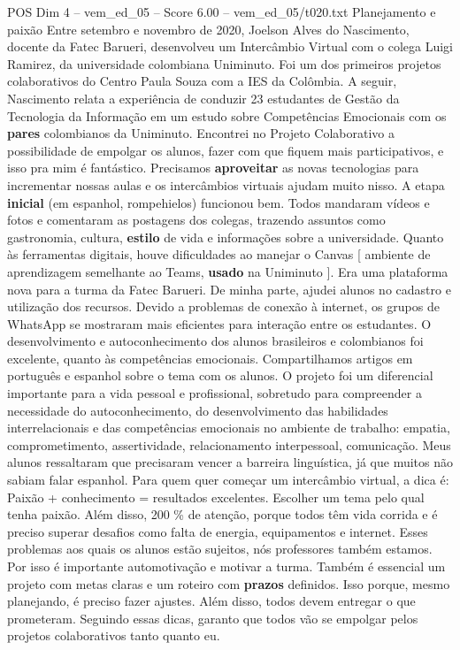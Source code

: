 \begin{textsample}{POS Dim 4 – vem\_ed\_05 – Score 6.00 – vem\_ed\_05/t020.txt}  \label{ex:f4_pos_077}
Planejamento e paixão Entre setembro e novembro de 2020, Joelson Alves do Nascimento, docente da Fatec Barueri, desenvolveu um Intercâmbio Virtual com o colega Luigi Ramirez, da universidade colombiana Uniminuto.
Foi um dos primeiros projetos colaborativos do Centro Paula Souza com a IES da Colômbia.
A seguir, Nascimento relata a experiência de conduzir 23 estudantes de Gestão da Tecnologia da Informação em um estudo sobre Competências Emocionais com os \textbf{pares} colombianos da Uniminuto.
Encontrei no Projeto Colaborativo a possibilidade de empolgar os alunos, fazer com que fiquem mais participativos, e isso pra mim é fantástico.
Precisamos \textbf{aproveitar} as novas tecnologias para incrementar nossas aulas e os intercâmbios virtuais ajudam muito nisso.
A etapa \textbf{inicial} (em espanhol, rompehielos) funcionou bem.
Todos mandaram vídeos e fotos e comentaram as postagens dos colegas, trazendo assuntos como gastronomia, cultura, \textbf{estilo} de vida e informações sobre a universidade.
Quanto às ferramentas digitais, houve dificuldades ao manejar o Canvas [ ambiente de aprendizagem semelhante ao Teams, \textbf{usado} na Uniminuto ].
Era uma plataforma nova para a turma da Fatec Barueri.
De minha parte, ajudei alunos no cadastro e utilização dos recursos.
Devido a problemas de conexão à internet, os grupos de WhatsApp se mostraram mais eficientes para interação entre os estudantes.
O desenvolvimento e autoconhecimento dos alunos brasileiros e colombianos foi excelente, quanto às competências emocionais.
Compartilhamos artigos em português e espanhol sobre o tema com os alunos.
O projeto foi um diferencial importante para a vida pessoal e profissional, sobretudo para compreender a necessidade do autoconhecimento, do desenvolvimento das habilidades interrelacionais e das competências emocionais no ambiente de trabalho: empatia, comprometimento, assertividade, relacionamento interpessoal, comunicação.
Meus alunos ressaltaram que precisaram vencer a barreira linguística, já que muitos não sabiam falar espanhol.
Para quem quer começar um intercâmbio virtual, a dica é: Paixão + conhecimento = resultados excelentes.
Escolher um tema pelo qual tenha paixão.
Além disso, 200 \% de atenção, porque todos têm vida corrida e é preciso superar desafios como falta de energia, equipamentos e internet.
Esses problemas aos quais os alunos estão sujeitos, nós professores também estamos.
Por isso é importante automotivação e motivar a turma.
Também é essencial um projeto com metas claras e um roteiro com \textbf{prazos} definidos.
Isso porque, mesmo planejando, é preciso fazer ajustes.
Além disso, todos devem entregar o que prometeram.
Seguindo essas dicas, garanto que todos vão se empolgar pelos projetos colaborativos tanto quanto eu.

\end{textsample}
